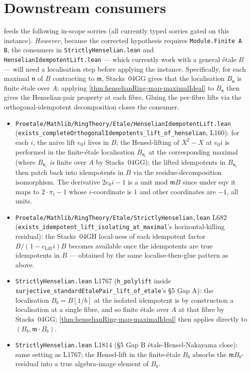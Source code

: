 \section{Downstream consumers}

 feeds the following
in-scope sorries (all currently typed sorries gated on this
instance). \emph{However}, because the corrected hypothesis
requires \texttt{Module.Finite A B}, the consumers in
\texttt{StrictlyHenselian.lean} and
\texttt{HenselianIdempotentLift.lean} — which currently work
with a general étale $B$ — will need a localisation step before
applying the instance. Specifically, for each maximal $\mathfrak
n$ of $B$ contracting to $\mathfrak m$, Stacks~04GG gives that
the localisation $B_{\mathfrak n}$ is finite étale over $A$;
applying \cref{thm:henselianRing-map-maximalIdeal} to
$B_{\mathfrak n}$ then gives the Henselian-pair property at
each fibre. Gluing the per-fibre lifts via the
orthogonal-idempotent decomposition closes the consumer.

\begin{itemize}
\item \texttt{Proetale/Mathlib/RingTheory/Etale/HenselianIdempotentLift.lean}
  (\texttt{exists\_completeOrthogonalIdempotents\_lift\_of\_henselian},
  L160): for each $i$, the naive lift $e_0 i$ lives in $B$; the
  Hensel-lifting of $X^2 - X$ at $e_0 i$ is performed in the
  finite-étale localisation $B_{\mathfrak n_i}$ at the
  corresponding maximal (where $B_{\mathfrak n_i}$ \emph{is}
  finite over $A$ by Stacks~04GG); the lifted idempotents in
  $B_{\mathfrak n_i}$ then patch back into idempotents in $B$
  via the residue-decomposition isomorphism. The derivative
  $2 e_0 i - 1$ is a unit mod $\mathfrak m B$ since under
  $\mathrm{eqv}$ it maps to $2 \cdot \pi_i - 1$ whose
  $i$-coordinate is $1$ and other coordinates are $-1$, all
  units.
\item \texttt{Proetale/Mathlib/RingTheory/Etale/StrictlyHenselian.lean}
  L682 (\texttt{exists\_idempotent\_lift\_isolating\_at\_maximal}'s
  horizontal-killing residual): the Stacks~04GH local-ness of each
  idempotent factor $B / (1 - e_{\mathrm{Lift}} i) B$ becomes
  available once the idempotents are true idempotents in $B$ —
  obtained by the same localise-then-glue pattern as above.
\item \texttt{StrictlyHenselian.lean} L1767 (\texttt{h\_polylift}
  inside \texttt{surjective\_standardEtalePair\_lift\_of\_etale}'s
  \S5 Gap A): the localisation $B_b = B[1/b]$ at the isolated
  idempotent is by construction a localisation at a single
  fibre, and so finite étale over $A$ at that fibre by
  Stacks~04GG; \cref{thm:henselianRing-map-maximalIdeal} then
  applies directly to $(B_b, \mathfrak m \cdot B_b)$.
\item \texttt{StrictlyHenselian.lean} L1814 (\S5 Gap B
  étale-Hensel-Nakayama close): same setting as L1767; the
  Hensel-lift in the finite-étale $B_b$ absorbs the $\mathfrak
  m B_b$-residual into a true algebra-image element of $B_b$.
\end{itemize}

